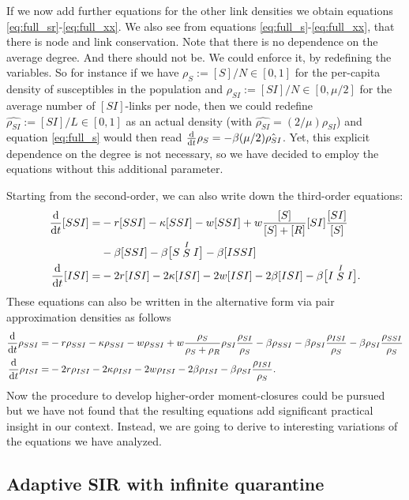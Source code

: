 \documentclass[12pt]{article}
\def\txtd{{\textnormal{d}}}
\begin{document}
If we now add further equations for the other link densities we obtain equations \eqref{eq:full_sr}-\eqref{eq:full_xx}. We also see from equations \eqref{eq:full_s}-\eqref{eq:full_xx}, that there is node and link conservation. Note that there is no dependence on the average degree. And there should not be. We could enforce it, by redefining the variables. So for instance if we have $\rho_S:= [S]/N \in [0,1]$ for the per-capita density of susceptibles in the population and $\rho_{SI}:=[SI]/N\in[0,\mu/2]$ for the average number of $[SI]$-links per node, then we could redefine $\hat{\rho_{SI}}:=[SI]/L\in[0,1]$ as an actual density (with $\hat{\rho_{SI}}=(2/\mu)\rho_{SI}$) and equation \eqref{eq:full_s} would then read $\frac{\txtd }{\txtd t} \rho_S= -\beta (\mu/2)\hat{\rho_{SI}}$. Yet, this explicit dependence on the degree is not necessary, so we have decided to employ the equations without this additional parameter.\medskip

Starting from the second-order, we can also write down the third-order equations:
\begin{align*}
\frac{\txtd }{\txtd t}{[SSI]}=&
-r[SSI]- \kappa [SSI] - w[SSI] 
+w \frac{[S]}{[S]+[R]}[SI]\frac{[SI]}{[S]} \\
&- \beta [SSI] - \beta \big[S\stackrel{I}{S}I\big] - \beta [ISSI]\\
\frac{\txtd }{\txtd t}{[ISI]}=&
-2r[ISI]- 2\kappa [ISI] - 2w[ISI] 
 - 2\beta [ISI] - \beta \big[I\stackrel{I}{S}I\big].
\end{align*}
These equations can also be written in the alternative form via pair approximation densities as follows
\begin{align*}
\frac{\txtd }{\txtd t}{\rho_{SSI}}=&
-r\rho_{SSI}- \kappa \rho_{SSI} - w\rho_{SSI} 
+w \frac{\rho_{S}}{\rho_{S}+\rho_{R}}\rho_{SI}\frac{\rho_{SI}}{\rho_{S}} - \beta \rho_{SSI} - \beta \rho_{SI}\frac{\rho_{ISI}}{\rho_{S}}- \beta \rho_{SI}\frac{\rho_{SSI}}{\rho_{S}}
\\
\frac{\txtd }{\txtd t}{\rho_{ISI}}=&
-2r\rho_{ISI}- 2\kappa \rho_{ISI} - 2w\rho_{ISI} 
 - 2\beta \rho_{ISI} - \beta \rho_{SI}\frac{\rho_{ISI}}{\rho_{S}}.
\end{align*}
Now the procedure to develop higher-order moment-closures could be pursued~\cite{KissMillerSimon} but we have not found that the resulting equations add significant practical insight in our context. Instead, we 
are going to derive to interesting variations of the equations we have analyzed.

\subsection{Adaptive SIR with infinite quarantine}
\end{document}
